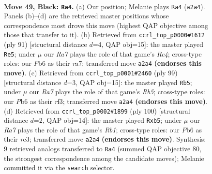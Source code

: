 \documentclass[11pt]{article}
\begin{document}
\clearpage

\begin{figure}[p]\centering
\begin{subfigure}{0.46\textwidth}\centering
\resizebox{\linewidth}{!}{%
\newchessgame
\chessboard[
  setfen={8/P7/1p4k1/8/8/6K1/r7/8 b - - 0 49},
  showmover=false,
  pgfstyle=straightmove, color=movearrow, markmove={a2-a4}
]}
\caption{}
\end{subfigure}\hfill
\begin{subfigure}{0.46\textwidth}\centering
\resizebox{\linewidth}{!}{%
\newchessgame
\chessboard[
  setfen={4k3/R7/6p1/2r3P1/8/3K4/8/8 b - - 2 46},
  showmover=false,
  pgfstyle=straightmove, color=movearrow, markmove={c5-e5}
]}
\caption{}
\end{subfigure}
\\[4pt]
\begin{subfigure}{0.46\textwidth}\centering
\resizebox{\linewidth}{!}{%
\newchessgame
\chessboard[
  setfen={6k1/8/8/8/1r5P/5R2/8/3K4 b - - 0 50},
  showmover=false,
  pgfstyle=straightmove, color=movearrow, markmove={b4-b5}
]}
\caption{}
\end{subfigure}\hfill
\begin{subfigure}{0.46\textwidth}\centering
\resizebox{\linewidth}{!}{%
\newchessgame
\chessboard[
  setfen={5k2/8/4K3/1p6/4P3/2r5/8/1R6 w - - 4 51},
  showmover=false,
  pgfstyle=straightmove, color=movearrow, markmove={b1-b5}
]}
\caption{}
\end{subfigure}
\caption{\textbf{Move 49, Black: \texttt{Ra4}.} (a) Our position; Melanie plays \texttt{Ra4} (\texttt{a2a4}). Panels (b)--(d) are the retrieved master positions whose correspondence most drove this move (highest QAP objective among those that transfer to it). (b) Retrieved from \texttt{ccrl\_top\_p0000\#1612} (ply 91) [structural distance $d$=4, QAP obj=15]: the master played \texttt{Re5}; under $\mu$ our \emph{Ra7} plays the role of that game's \emph{Rc4}; cross-type roles: our \emph{P}b6 as their \emph{r}a7; transferred move \texttt{a2a4} \textbf{(endorses this move)}. (c) Retrieved from \texttt{ccrl\_top\_p0001\#2460} (ply 99) [structural distance $d$=3, QAP obj=15]: the master played \texttt{Rb5}; under $\mu$ our \emph{Ra7} plays the role of that game's \emph{Rb5}; cross-type roles: our \emph{P}b6 as their \emph{r}f3; transferred move \texttt{a2a4} \textbf{(endorses this move)}. (d) Retrieved from \texttt{ccrl\_top\_p0002\#1899} (ply 100) [structural distance $d$=2, QAP obj=14]: the master played \texttt{Rxb5}; under $\mu$ our \emph{Ra7} plays the role of that game's \emph{Rb1}; cross-type roles: our \emph{P}b6 as their \emph{r}c3; transferred move \texttt{a2a4} \textbf{(endorses this move)}. Synthesis: 9 retrieved analogs transferred to \texttt{Ra4} (summed QAP objective 80, the strongest correspondence among the candidate moves); Melanie committed it via the \texttt{search} selector.}
\label{fig:thought-m97}
\end{figure}
\end{document}
